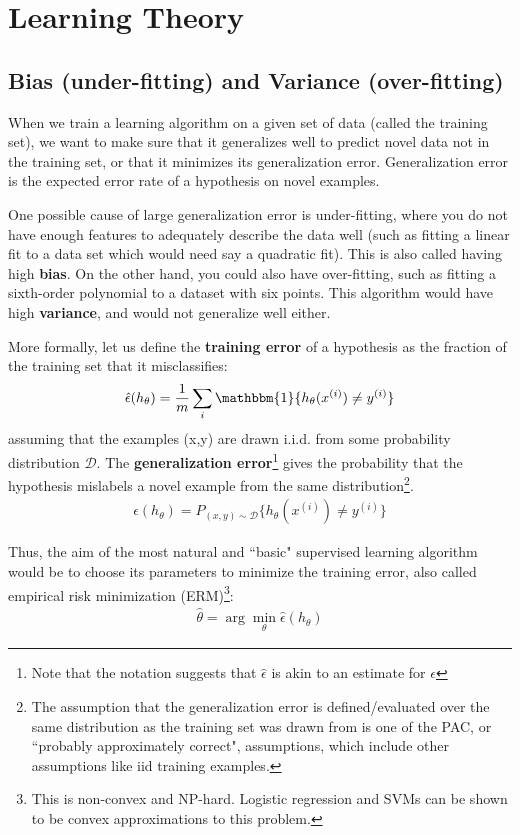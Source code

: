 \documentclass[letterpaper,10pt]{article}
\begin{document}
\section{Learning Theory}
\subsection{Bias (under-fitting) and Variance (over-fitting)}

When we train a learning algorithm on a given set of data (called the training set), we want to make sure that it generalizes well to predict novel data not in the training set, or that it minimizes its generalization error. Generalization error is the expected error rate of a hypothesis on novel examples.

One possible cause of large generalization error is under-fitting, where you do not have enough features to adequately describe the data well (such as fitting a linear fit to a data set which would need say a quadratic fit). This is also called having high \textbf{bias}. On the other hand, you could also have over-fitting, such as fitting a sixth-order polynomial to a dataset with six points. This algorithm would have high \textbf{variance}, and would not generalize well either.

More formally, let us define the \textbf{training error} of a hypothesis as the fraction of the training set that it misclassifies:
\begin{align}
\hat \epsilon(h_\theta) = \frac{1}{m} \sum_{i} \mathbbm{1}\{h_\theta(x^{(i)}) \neq y^{(i)} \}
\end{align}
assuming that the examples (x,y) are drawn i.i.d. from some probability distribution $\mathscr{D}$. The \textbf{generalization error}\footnote{Note that the notation suggests that $\hat \epsilon$ is akin to an estimate for $\epsilon$} gives the probability that the hypothesis mislabels a novel example from the same distribution\footnote{The assumption that the generalization error is defined/evaluated over the same distribution as the training set was drawn from is one of the PAC, or ``probably approximately correct", assumptions, which include other assumptions like iid training examples.}.
\begin{align}
\epsilon(h_\theta) = P_{(x,y)\sim\mathscr{D}}\{h_\theta(x^{(i)}) \neq y^{(i)} \}
\end{align}

Thus, the aim of the most natural and ``basic" supervised learning algorithm would be to choose its parameters to minimize the training error, also called empirical risk minimization (ERM)\footnote{This is non-convex and NP-hard. Logistic regression and SVMs can be shown to be convex approximations to this problem.}:
\begin{align}
\hat \theta = \arg \min_\theta \hat \epsilon(h_\theta)
\end{align}
\end{document}
